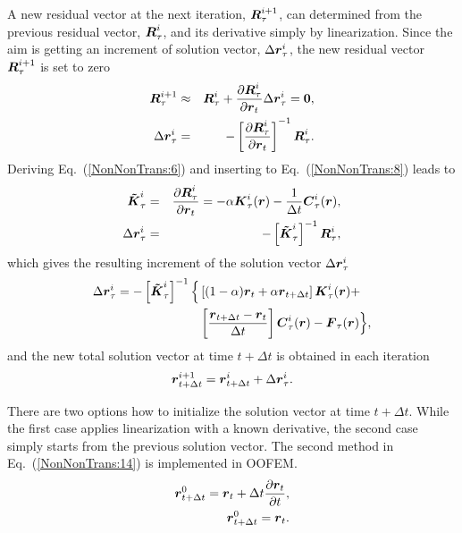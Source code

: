 \documentclass[a4paper]{article}
\newcommand{\mbf}[1]{\mbox{\boldmath$#1$}}
\newcommand{\del}[2]{\mbox{$\displaystyle\frac{#1}{#2}$}}
\newcommand{\refeq}[1]{Eq.~(\ref{#1})}
\begin{document}
A new residual vector at the next iteration, $\mbf{R}_\tau^{i+1}$, can determined from the previous residual vector, $\mbf{R}_{\tau}^i$, and its derivative simply by linearization. Since the aim is getting an increment of solution vector, $\Delta\mbf{r}_{\tau}^i$, the new residual vector $\mbf{R}_{\tau}^{i+1}$ is set to zero
\begin{eqnarray}
\mbf{R}_\tau^{i+1} &\approx& \mbf{R}_{\tau}^i+\frac{\partial{\mbf{R}_{\tau}^i}}{\partial\mbf{r}_t} \Delta\mbf{r}_{\tau}^i = \mbf{0},\label{NonNonTrans:7}\\
\Delta \mbf{r}_{\tau}^i &=& - \left[\frac{\partial{\mbf{R}_{\tau}^i}}{\partial\mbf{r}_t}\right]^{-1} \mbf{R}_{\tau}^i\label{NonNonTrans:8}.
\end{eqnarray}
Deriving \refeq{NonNonTrans:6} and inserting to \refeq{NonNonTrans:8} leads to
\begin{eqnarray}
\mbf{\tilde K}_\tau^i &=& \frac{\partial{\mbf{R}_{\tau}^i}}{\partial\mbf{r}_t} = -\alpha \mbf{K}_{\tau}^i(\mbf{r}) - \del{1}{\Delta
t}\mbf{C}_{\tau}^i(\mbf{r})\label{NonNonTrans:9},\\
\Delta \mbf{r}_{\tau}^i &=& - \left[\mbf{\tilde K}_\tau^i\right]^{-1} \mbf{R}_{\tau}^i,\label{NonNonTrans:10}
\end{eqnarray}
which gives the resulting increment of the solution vector $\Delta \mbf{r}_{\tau}^i$
\begin{equation}
\begin{split}
\Delta \mbf{r}_{\tau}^i = - \left[\mbf{\tilde K}_\tau^i\right]^{-1} \Big\{ &\left[(1-\alpha)\mbf{r}_t + \alpha\mbf{r}_{t+\Delta t} \right] \mbf{K}_{\tau}^i(\mbf{r}) +\\
&\left[\del{\mbf{r}_{t+\Delta t}-\mbf{r}_t}{\Delta t}\right] \mbf{C}_{\tau}^i(\mbf{r}) - \mbf{F}_{\tau}(\mbf{r}) \Big\},\label{NonNonTrans:11}
\end{split}
\end{equation}
and the new total solution vector at time $t + \Delta t$ is obtained in each iteration
\begin{eqnarray}
\mbf{r}_{t+\Delta t}^{i+1}=\mbf{r}_{t+\Delta t}^{i} + \Delta\mbf{r}_{\tau}^i.\label{NonNonTrans:12}
\end{eqnarray}

There are two options how to initialize the solution vector at time $t + \Delta t$. While the first case applies linearization with a known derivative, the second case simply starts from the previous solution vector. The second method in \refeq{NonNonTrans:14} is implemented in OOFEM.
\begin{eqnarray}
\mbf{r}_{t+\Delta t}^{0} = \mbf{r}_t + \Delta t\frac{\partial{\mbf{r}_t}}{\partial t},\label{NonNonTrans:13}\\
\mbf{r}_{t+\Delta t}^{0} = \mbf{r}_t.\label{NonNonTrans:14}
\end{eqnarray}
\end{document}
